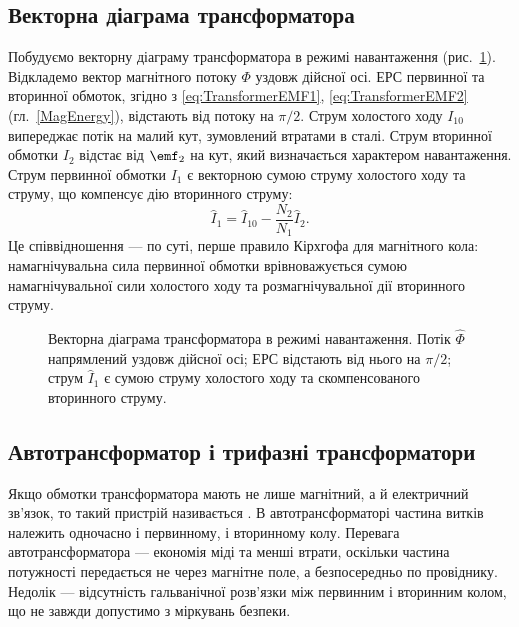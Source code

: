 \subsection*{Векторна діаграма трансформатора}

Побудуємо векторну діаграму трансформатора в режимі
навантаження (рис.~\ref{tikz:transformer_phasor}). Відкладемо
вектор магнітного потоку $\Phi$ уздовж дійсної осі. ЕРС
первинної та вторинної обмоток, згідно з \eqref{eq:TransformerEMF1},
\eqref{eq:TransformerEMF2} (гл.~\ref{MagEnergy}),
відстають від потоку на $\pi/2$. Струм холостого ходу
$I_{10}$ випереджає потік на малий кут, зумовлений втратами в
сталі. Струм вторинної обмотки $I_2$ відстає від $\emf_2$ на
кут, який визначається характером навантаження. Струм первинної
обмотки $I_1$ є векторною сумою струму холостого ходу та
струму, що компенсує дію вторинного струму:
\begin{equation}\label{eq:primary_current_phasor}
	\hat{I}_1 = \hat{I}_{10} - \frac{N_2}{N_1}\hat{I}_2.
\end{equation}
Це співвідношення --- по суті, перше правило Кірхгофа для
магнітного кола: намагнічувальна сила первинної обмотки
врівноважується сумою намагнічувальної сили холостого ходу та
розмагнічувальної дії вторинного струму.

\begin{figure}[h!]
	\centering
	\caption{Векторна діаграма трансформатора в режимі
	навантаження. Потік $\hat{\Phi}$ напрямлений уздовж
	дійсної осі; ЕРС відстають від нього на $\pi/2$; струм
	$\hat{I}_1$ є сумою струму холостого ходу та
	скомпенсованого вторинного струму.}
	\label{tikz:transformer_phasor}
\end{figure}

\subsection*{Автотрансформатор і трифазні трансформатори}

Якщо обмотки трансформатора мають не лише магнітний, а й
електричний зв'язок, то такий пристрій називається
. В автотрансформаторі частина
витків належить одночасно і первинному, і вторинному колу.
Перевага автотрансформатора --- економія міді та менші втрати,
оскільки частина потужності передається не через магнітне поле,
а безпосередньо по провіднику. Недолік --- відсутність
гальванічної розв'язки між первинним і вторинним колом, що не
завжди допустимо з міркувань безпеки.

